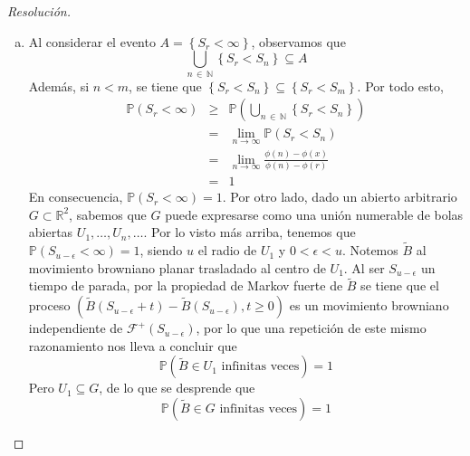 \documentclass[a4paper,11pt]{article}
\newcommand{\Prob}[1]{\ensuremath{\mathbb{P} \left( #1 \right)}}
\newcommand{\Ev}[1]{\ensuremath{\left\{ #1 \right\}}}
\begin{document}
\begin{proof}[Resoluci\'on]
\begin{enumerate}[a.]
    \item Al considerar el evento $A = \Ev{S_r < \infty}$, observamos que
    $$\bigcup_{n \, \in \, \mathbb{N}}{\Ev{S_r < S_n}} \subseteq A$$
    Además, si $n < m$, se tiene que $\Ev{S_r < S_n} \subseteq \Ev{S_r < S_m}$. Por todo esto,
    \begin{eqnarray*}
        \Prob{S_r < \infty} &\geq& \Prob{\bigcup_{n \, \in \, \mathbb{N}}{\Ev{S_r < S_n}}} \\
            &=& \lim_{n \to \infty}{\Prob{S_r < S_n}} \\
            &=& \lim_{n \to \infty}{\frac{\phi(n) - \phi(x)}{\phi(n) - \phi(r)}} \\
            &=& 1
    \end{eqnarray*}
    En consecuencia, $\Prob{S_r < \infty} = 1$. Por otro lado, dado un abierto arbitrario
    $G \subset \mathbb{R}^2$, sabemos que $G$ puede expresarse como una unión numerable
    de bolas abiertas $U_1,\dots,U_n,\dots$.
    Por lo visto más arriba, tenemos que $\Prob{S_{u - \epsilon} < \infty} = 1$,
    siendo $u$ el radio de $U_1$ y $0 < \epsilon < u$. Notemos $\tilde{B}$ al movimiento
    browniano planar trasladado al centro de $U_1$. Al ser $S_{u - \epsilon}$ un
    tiempo de parada, por la propiedad de Markov fuerte de $\tilde{B}$ se tiene que el proceso
    $(\tilde{B}(S_{u-\epsilon} + t) - \tilde{B}(S_{u-\epsilon}), t \geq 0)$
    es un movimiento browniano independiente de $\mathcal{F}^{+}(S_{u-\epsilon})$,
    por lo que una repetición de este mismo razonamiento nos lleva a concluir que 
    $$\Prob{\tilde{B} \in U_1 \textrm{ infinitas veces}} = 1$$
    Pero $U_1 \subseteq G$, de lo que se desprende que
    $$\Prob{\tilde{B} \in G \textrm{ infinitas veces}} = 1$$
\end{enumerate}
\end{proof}
\end{document}
